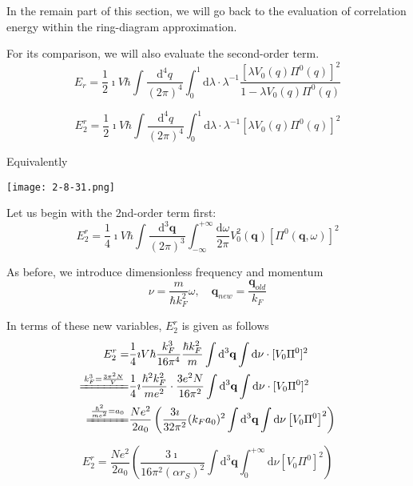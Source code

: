 In the remain part of this section, we will go back to the evaluation of correlation energy within the ring-diagram approximation.

For its comparison, we will also evaluate the second-order term.
\begin{equation*} \tag{2.8.9}
E_r = \frac{1}{2}\imath V\hbar \int \frac{\mathrm{d}^4 q}{(2\pi)^4} \int_0^1 \mathrm{d} \lambda \cdot \lambda^{-1} \frac{[\lambda V_0(q) \Pi^0(q)]^2}{1-\lambda V_0(q) \Pi^0(q)}
\end{equation*}

\begin{equation*} \label{Eqs2.8.9.a} \tag{2.8.9.a}
E_2^r = \frac{1}{2}\imath V \hbar\int \frac{\mathrm{d}^4 q}{(2\pi)^4} \int_0^1 \mathrm{d} \lambda \cdot \lambda^{-1}  \left[ \lambda V_0(q)\Pi^0(q) \right]^2
\end{equation*}

Equivalently
\begin{center} \label{Fig2.8.31}
\texttt{[image: 2-8-31.png]}
\end{center}

Let us begin with the 2nd-order term first:
\[E_2^r = \frac{1}{4}\imath V \hbar\int \frac{\mathrm{d}^3 \mathbf{q}}{(2\pi)^3} \int_{-\infty}^{+\infty} \frac{\mathrm{d} \omega}{2\pi} V_0^2(\mathbf{q})  \left[ \Pi^0(\mathbf{q},\omega) \right]^2\]

As before, we introduce dimensionless frequency and momentum
\begin{equation*} \tag{2.8.18}
\nu = \frac{m}{\hbar k_F^2} \omega, \quad \mathbf{q}_{new} = \frac{\mathbf{q}_{old}}{k_F}
\end{equation*}

In terms of these new variables, $E_2^r$ is given as follows
\[\begin{split}E_2^r =& \frac{1}{4}\imath V \hbar \frac{k_F^3}{16\pi^4} \frac{\hbar k_F^2}{m}
\int \mathrm{d}^3 \mathbf{q} \int \mathrm{d} \nu \cdot [V_0 \Pi^0]^2\\
\xlongequal{k_F^3 = \frac{3\pi^2 N}{V}}& \frac{1}{4}\imath\frac{\hbar^2 k_F^2}{m e^2}\cdot \frac{3 e^2 N}{16 \pi^2}
\int \mathrm{d}^3 \mathbf{q} \int \mathrm{d} \nu \cdot [V_0 \Pi^0]^2\\
\xlongequal{\frac{\hbar^2}{m e^2}=a_0}& \frac{N e^2}{2 a_0} \left( \frac{3\imath}{32\pi^2}(k_F a_0)^2 \int \mathrm{d}^3 \mathbf{q} \int \mathrm{d} \nu \left[ V_0 \Pi^0 \right]^2 \right)
\end{split}\]

\begin{equation*} \label{Eqs2.8.9.b} \tag{2.8.9.b}
E_2^r = \frac{N e^2}{2 a_0} \left( \frac{3\imath}{16\pi^2 (\alpha r_S)^2} \int \mathrm{d}^3 \mathbf{q} \int_0^{+\infty} \mathrm{d} \nu \left[ V_0 \Pi^0 \right]^2 \right)
\end{equation*}

